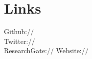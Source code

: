\documentclass[]{deedy-resume-openfont}
\begin{document}
\begin{minipage}[t]{0.33\textwidth}


\section{Links} 
Github:// \href{https://github.com/aazaff}{} \\
Twitter://  \href{https://twitter.com/azstrata}{} \\
ResearchGate://  \href{https://www.researchgate.net/profile/Andrew_Zaffos} {}
Website:// \href{http://www.azstrata.org}{}

\sectionsep





\end{minipage}
\end{document}
